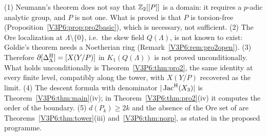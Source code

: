 \begin{remark}\label{V3P6:rem:pro2corrections}
(1) Neumann's theorem does not say that $\mathbb{Z}_2[[P]]$ is a domain: it requires a $p$-adic analytic
group, and $P$ is not one. What is proved is that $P$ is torsion-free
(Proposition~\ref{V3P6:prop:pro2basic}), which is necessary, not sufficient. (2) The Ore
localization at $\Lambda\setminus\{0\}$, i.e.\ the skew field $Q(\Lambda)$, is not known to exist:
Goldie's theorem needs a Noetherian ring (Remark~\ref{V3P6:rem:pro2open}). (3) Therefore
$\partial[\Delta^{\mathrm{H}}_\Lambda]=[X(Y/P)]$ in $K_1(Q(\Lambda))$ is not proved unconditionally. What holds
unconditionally is Theorem~\ref{V3P6:thm:pro2}, the same identity at every finite level, compatibly
along the tower, with $X(Y/P)$ recovered as the limit. (4) The descent formula with denominator
$|\operatorname{Jac}^{\mathrm{H}}(X_3)|$ is Theorem~\ref{V3P6:thm:main}(iv); in Theorem~\ref{V3P6:thm:pro2}(iv) it computes the
order of the boundary. (5) $d(P_k)\ge2k$ and the absence of the Ore set of \cite{CFKSV} are
Theorems~\ref{V3P6:thm:tower}(iii) and~\ref{V3P6:thm:nozp}, as stated in the proposed programme.
\end{remark}
